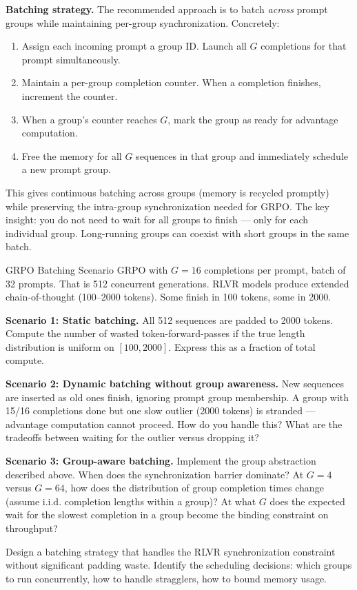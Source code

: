 \textbf{Batching strategy.} The recommended approach is to batch \textit{across} prompt groups while maintaining per-group synchronization. Concretely:
\begin{enumerate}
  \item Assign each incoming prompt a group ID. Launch all $G$ completions for that prompt simultaneously.
  \item Maintain a per-group completion counter. When a completion finishes, increment the counter.
  \item When a group's counter reaches $G$, mark the group as ready for advantage computation.
  \item Free the memory for all $G$ sequences in that group and immediately schedule a new prompt group.
\end{enumerate}

This gives continuous batching across groups (memory is recycled promptly) while preserving the intra-group synchronization needed for GRPO. The key insight: you do not need to wait for all groups to finish --- only for each individual group. Long-running groups can coexist with short groups in the same batch.

\begin{thinkfirst}{GRPO Batching Scenario}
GRPO with $G = 16$ completions per prompt, batch of 32 prompts. That is 512 concurrent generations. RLVR models produce extended chain-of-thought (100--2000 tokens). Some finish in 100 tokens, some in 2000.

\textbf{Scenario 1: Static batching.} All 512 sequences are padded to 2000 tokens. Compute the number of wasted token-forward-passes if the true length distribution is uniform on $[100, 2000]$. Express this as a fraction of total compute.

\textbf{Scenario 2: Dynamic batching without group awareness.} New sequences are inserted as old ones finish, ignoring prompt group membership. A group with 15/16 completions done but one slow outlier (2000 tokens) is stranded --- advantage computation cannot proceed. How do you handle this? What are the tradeoffs between waiting for the outlier versus dropping it?

\textbf{Scenario 3: Group-aware batching.} Implement the group abstraction described above. When does the synchronization barrier dominate? At $G = 4$ versus $G = 64$, how does the distribution of group completion times change (assume i.i.d. completion lengths within a group)? At what $G$ does the expected wait for the slowest completion in a group become the binding constraint on throughput?

Design a batching strategy that handles the RLVR synchronization constraint without significant padding waste. Identify the scheduling decisions: which groups to run concurrently, how to handle stragglers, how to bound memory usage.
\end{thinkfirst}


